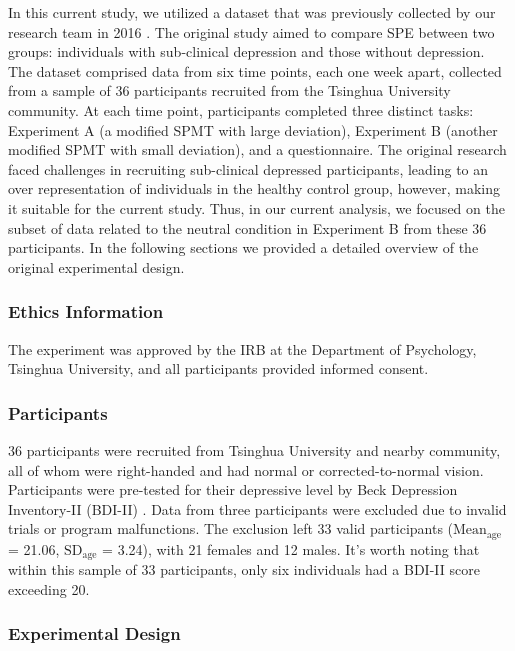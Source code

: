 \documentclass[sn-apa]{sn-jnl}%
\theoremstyle{thmstyleone}%
\theoremstyle{thmstyletwo}%
\theoremstyle{thmstylethree}%
\begin{document}
In this current study, we utilized a dataset that was previously collected by our research team in 2016 \parencite{hu2023data}. The original study aimed to compare SPE between two groups: individuals with sub-clinical depression and those without depression. The dataset comprised data from six time points, each one week apart, collected from a sample of 36 participants recruited from the Tsinghua University community. At each time point, participants completed three distinct tasks: Experiment A (a modified SPMT with large deviation), Experiment B (another modified SPMT with small deviation), and a questionnaire. The original research faced challenges in recruiting sub-clinical depressed participants, leading to an over representation of individuals in the healthy control group, however, making it suitable for the current study. Thus, in our current analysis, we focused on the subset of data related to the neutral condition in Experiment B from these 36 participants. In the following sections we provided a detailed overview of the original experimental design. 

\subsubsection{Ethics Information}\label{subsec:ethics}

The experiment was approved by the IRB at the Department of Psychology, Tsinghua University, and all participants provided informed consent.

\subsubsection{Participants}\label{subsec:participants}

36 participants were recruited from Tsinghua University and nearby community, all of whom were right-handed and had normal or corrected-to-normal vision. Participants were pre-tested for their depressive level by Beck Depression Inventory-II (BDI-II) \parencite{wang2011reliability}. Data from three participants were excluded due to invalid trials or program malfunctions. The exclusion left 33 valid participants ($\text{Mean}_{\text{age}}$ = 21.06, $\text{SD}_{\text{age}}$ = 3.24), with 21 females and 12 males. It's worth noting that within this sample of 33 participants, only six individuals had a BDI-II score exceeding 20.

\subsubsection{Experimental Design}\label{subsec:experimentaldesign}
\end{document}
